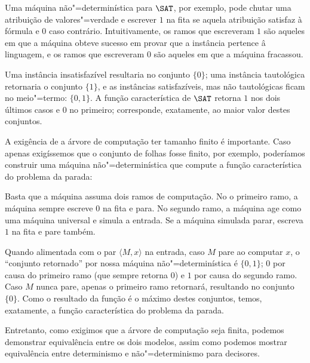 Uma máquina não"=determinística para $\SAT$,
por exemplo,
pode chutar uma atribuição de valores"=verdade
e escrever $1$ na fita se aquela atribuição satisfaz à fórmula
e $0$ caso contrário.
Intuitivamente, os ramos que escreveram $1$ são aqueles em que
a máquina obteve sucesso em provar que a instância pertence â linguagem,
e os ramos que escreveram $0$ são aqueles em que a máquina fracassou.

Uma instância insatisfazível resultaria no conjunto $\{0\}$;
uma instância tautológica retornaria o conjunto $\{1\}$,
e as instâncias satisfazíveis, mas não tautológicas
ficam no meio"=termo: $\{0, 1\}$.
A função característica de $\SAT$ retorna $1$ nos dois últimos casos
e $0$ no primeiro;
corresponde, exatamente,
ao maior valor destes conjuntos.

A exigência de a árvore de computação ter tamanho finito é importante.
Caso apenas exigíssemos que o conjunto de folhas fosse finito, por exemplo,
poderíamos construir uma máquina não"=determinística
que compute a função característica do problema da parada:

Basta que a máquina assuma dois ramos de computação.
No o primeiro ramo, a máquina sempre escreve $0$ na fita e para.
No segundo ramo,
a máquina age como uma máquina universal e simula a entrada.
Se a máquina simulada parar, escreva $1$ na fita e pare também.

Quando alimentada com o par $\langle M, x \rangle$ na entrada,
caso $M$ pare ao computar $x$,
o ``conjunto retornado'' por nossa máquina não"=determinística é $\{0, 1\}$;
$0$ por causa do primeiro ramo (que sempre retorna $0$)
e $1$ por causa do segundo ramo.
Caso $M$ nunca pare, apenas o primeiro ramo retornará,
resultando no conjunto $\{0\}$.
Como o resultado da função é o máximo destes conjuntos,
temos, exatamente,
a função característica do problema da parada.

Entretanto, como exigimos que a árvore de computação seja finita,
podemos demonstrar equivalência entre os dois modelos,
assim como podemos mostrar equivalência entre determinismo e não"=determinismo
para decisores.

